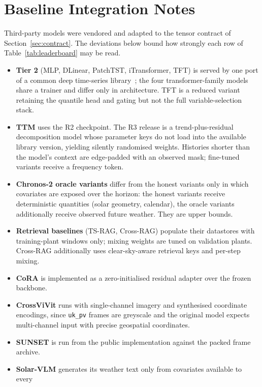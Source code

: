\chapter{Baseline Integration Notes}
\label{app:integration}

Third-party models were vendored and adapted to the tensor contract of
Section~\ref{sec:contract}. The deviations below bound how strongly each row of
Table~\ref{tab:leaderboard} may be read.

\begin{itemize}
  \item \textbf{Tier 2} (MLP, DLinear, PatchTST, iTransformer, TFT) is served by one port of
    a common deep time-series library~\cite{tslib}; the four transformer-family models share
    a trainer and differ only in architecture. TFT is a reduced variant retaining the
    quantile head and gating but not the full variable-selection stack.
  \item \textbf{TTM} uses the R2 checkpoint. The R3 release is a trend-plus-residual
    decomposition model whose parameter keys do not load into the available library version,
    yielding silently randomised weights. Histories shorter than the model's context are
    edge-padded with an observed mask; fine-tuned variants receive a frequency token.
  \item \textbf{Chronos-2 oracle variants} differ from the honest variants only in which
    covariates are exposed over the horizon: the honest variants receive deterministic
    quantities (solar geometry, calendar), the oracle variants additionally receive observed
    future weather. They are upper bounds.
  \item \textbf{Retrieval baselines} (TS-RAG, Cross-RAG) populate their datastores with
    training-plant windows only; mixing weights are tuned on validation plants. Cross-RAG
    additionally uses clear-sky-aware retrieval keys and per-step mixing.
  \item \textbf{CoRA} is implemented as a zero-initialised residual adapter over the frozen
    backbone.
  \item \textbf{CrossViVit} runs with single-channel imagery and synthesised coordinate
    encodings, since \texttt{uk\_pv} frames are greyscale and the original model expects
    multi-channel input with precise geospatial coordinates.
  \item \textbf{SUNSET} is run from the public implementation against the packed frame
    archive.
  \item \textbf{Solar-VLM} generates its weather text only from covariates available to every

\end{itemize}
